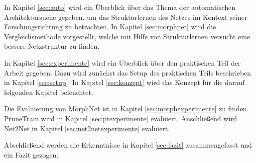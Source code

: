 In Kapitel \ref{sec:auto} wird ein Überblick über das Thema der automatischen Architektursuche gegeben, um das Strukturlernen des Netzes im Kontext seiner Forschungsrichtung zu betrachten. In Kapitel \ref{sec:morphnet} wird die Vergleichsmethode vorgestellt, welche mit Hilfe von Strukturlernen versucht eine bessere Netzstruktur zu finden.


In Kapitel \ref{sec:experimente} wird ein Überblick über den praktischen Teil der Arbeit gegeben. Dazu wird zunächst das Setup des praktischen Teils beschrieben in Kapitel \ref{sec:setup}. In Kapitel \ref{sec:konzept} wird das Konzept für die darauf folgenden Kapitel beleuchtet.


Die Evaluierung von MorphNet ist in Kapitel \ref{sec:morphexperimente} zu finden. 
PruneTrain wird in Kapitel \ref{sec:ptexperimente} evaluiert. Anschließend wird Net2Net in Kapitel \ref{sec:net2netexperimente} evaluiert.

Abschließend werden die Erkenntnisse in Kapitel \ref{sec:fazit}
 zusammengefasst und ein Fazit gezogen.
